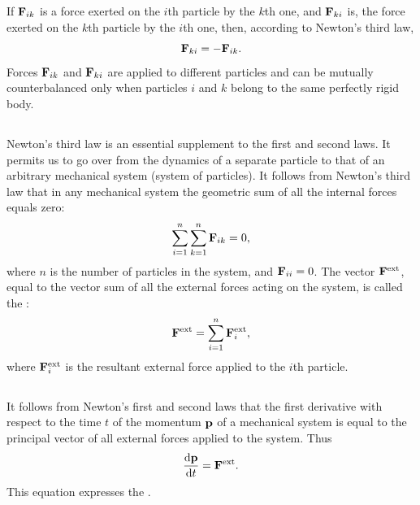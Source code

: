 If $\vb{F}_{ik}$ is a force exerted on the $i$th particle by the $k$th one, and $\vb{F}_{ki}$ is, the force exerted on the $k$th particle by the $i$th one, then, according to Newton's third law,
\begin{equation*}%
\vb{F}_{ki} = - \vb{F}_{ik}.
\end{equation*}
Forces $\vb{F}_{ik}$ and $\vb{F}_{ki}$ are applied to different particles and can be mutually counterbalanced only when particles $i$ and $k$ belong to the same perfectly rigid body.

\subsection{}\label{2.5.2} Newton's third law is an essential supplement to the first and second laws. It permits us to go over from the dynam­ics of a separate particle to that of an arbitrary mechanical system (system of particles). It follows from Newton's third law that in any mechanical system the geometric sum of all the internal forces  equals zero:
\begin{equation*}%
\sum_{i=1}^{n}\sum_{k=1}^{n} \vb{F}_{ik} = 0,
\end{equation*}
where $n$ is the number of particles in the system, and $\vb{F}_{ii} = 0$. The vector $\vb{F}^{\textrm{ext}}$, equal to the vector sum of all the external forces  acting on the system, is called the :
\begin{equation*}%
\vb{F}^{\textrm{ext}} = \sum_{i=1}^{n} \vb{F}^{\textrm{ext}}_{i},
\end{equation*}
where $\vb{F}^{\textrm{ext}}_{i}$ is the resultant external force applied to the $i$th particle.

\subsection{}\label{2.5.3} It follows from Newton's first and second laws that the first derivative with respect to the time $t$ of the momentum $\vb{p}$ of a mechanical system  is equal to the principal vector of all external forces applied to the system. Thus
\begin{equation*}%
\dv{\vb{p}}{t} = \vb{F}^{\textrm{ext}}.
\end{equation*}
This equation expresses the . 

